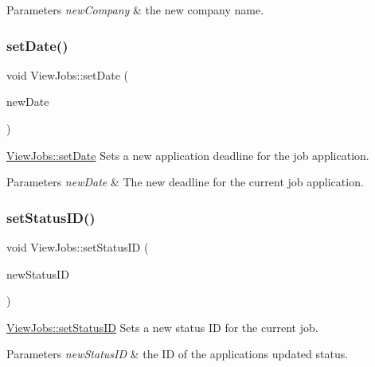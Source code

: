 \begin{DoxyParams}{Parameters}
{\em new\+Company} & the new company name. \\
\hline
\end{DoxyParams}
\mbox{\label{class_view_jobs_a7574794410eb40956f343976de97221f}} 
\subsubsection{\texorpdfstring{set\+Date()}{setDate()}}
{\footnotesize\ttfamily void View\+Jobs\+::set\+Date (\begin{DoxyParamCaption}\item[{Q\+String}]{new\+Date }\end{DoxyParamCaption})}



\hyperlink{class_view_jobs_a7574794410eb40956f343976de97221f}{View\+Jobs\+::set\+Date} Sets a new application deadline for the job application. 


\begin{DoxyParams}{Parameters}
{\em new\+Date} & The new deadline for the current job application. \\
\hline
\end{DoxyParams}
\mbox{\label{class_view_jobs_a55943415fd91377d5f701f7074ba58d6}} 
\subsubsection{\texorpdfstring{set\+Status\+I\+D()}{setStatusID()}}
{\footnotesize\ttfamily void View\+Jobs\+::set\+Status\+ID (\begin{DoxyParamCaption}\item[{int}]{new\+Status\+ID }\end{DoxyParamCaption})}



\hyperlink{class_view_jobs_a55943415fd91377d5f701f7074ba58d6}{View\+Jobs\+::set\+Status\+ID} Sets a new status ID for the current job. 


\begin{DoxyParams}{Parameters}
{\em new\+Status\+ID} & the ID of the application\textquotesingle{}s updated status. \\
\hline
\end{DoxyParams}
\mbox{\label{class_view_jobs_abfe1969197cde57ea049c1b7d91cd4f5}} 
